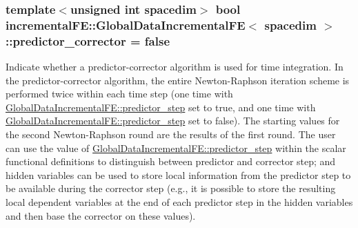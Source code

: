 \subsubsection[{\texorpdfstring{predictor\+\_\+corrector}{predictor_corrector}}]{\setlength{\rightskip}{0pt plus 5cm}template$<$unsigned int spacedim$>$ bool {\bf incremental\+F\+E\+::\+Global\+Data\+Incremental\+FE}$<$ spacedim $>$\+::predictor\+\_\+corrector = false\hspace{0.3cm}{\ttfamily [private]}}\hypertarget{classincremental_f_e_1_1_global_data_incremental_f_e_a5cc0d20e5e389c149bbd288f57dee953}{}\label{classincremental_f_e_1_1_global_data_incremental_f_e_a5cc0d20e5e389c149bbd288f57dee953}
Indicate whether a predictor-\/corrector algorithm is used for time integration. In the predictor-\/corrector algorithm, the entire Newton-\/\+Raphson iteration scheme is performed twice within each time step (one time with \hyperlink{classincremental_f_e_1_1_global_data_incremental_f_e_afe172fdb882f9dd0cd5f963386dd2ffb}{Global\+Data\+Incremental\+F\+E\+::predictor\+\_\+step} set to {\ttfamily true}, and one time with \hyperlink{classincremental_f_e_1_1_global_data_incremental_f_e_afe172fdb882f9dd0cd5f963386dd2ffb}{Global\+Data\+Incremental\+F\+E\+::predictor\+\_\+step} set to {\ttfamily false}). The starting values for the second Newton-\/\+Raphson round are the results of the first round. The user can use the value of \hyperlink{classincremental_f_e_1_1_global_data_incremental_f_e_afe172fdb882f9dd0cd5f963386dd2ffb}{Global\+Data\+Incremental\+F\+E\+::predictor\+\_\+step} within the scalar functional definitions to distinguish between predictor and corrector step; and hidden variables can be used to store local information from the predictor step to be available during the corrector step (e.\+g., it is possible to store the resulting local dependent variables at the end of each predictor step in the hidden variables and then base the corrector on these values). 
